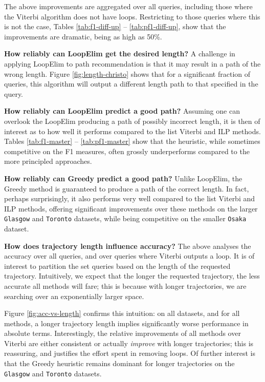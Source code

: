 The above improvements are aggregated over all queries, including those where the {\sc Viterbi} algorithm does not have loops.
Restricting to those queries where this is not the case,
Tables \ref{tab:f1-diff-up} -- \ref{tab:pf1-diff-up},
show that the improvements are dramatic, being as high as 50\%.

\textbf{How reliably can {\sc LoopElim} get the desired length?}
A challenge in applying {\sc LoopElim} to path recommendation
is that it may result in a path of the wrong length.
Figure \ref{fig:length-christo} shows that for a significant fraction of queries, this algorithm will output a different length path to that specified in the query.

\textbf{How reliably can {\sc LoopElim} predict a good path?}
Assuming one can overlook the {\sc LoopElim} producing a path of possibly incorrect length,
it is then of interest as to how well it performs compared to the list Viterbi and ILP methods.
Tables \ref{tab:f1-master} -- \ref{tab:pf1-master} show that the heuristic, while sometimes competitive on the F1 measures, often
grossly underperforms compared to the more principled approaches.


\textbf{How reliably can {\sc Greedy} predict a good path?}
Unlike {\sc LoopElim}, the {\sc Greedy} method is guaranteed to produce a path of the correct length.
In fact, perhaps surprisingly, it also performs very well compared to the list Viterbi and ILP methods, 
offering significant improvements over these methods on the larger {\tt Glasgow} and {\tt Toronto} datasets,
while being competitive on the smaller {\tt Osaka} dataset.


\textbf{How does trajectory length influence accuracy?}
The above analyses the accuracy over all queries, and over queries where {\sc Viterbi} outputs a loop.
It is of interest to partition the set queries based on the length of the requested trajectory.
Intuitively, we expect that the longer the requested trajectory, the less accurate all methods will fare; this is because with longer trajectories, we are searching over an exponentially larger space.

Figure \ref{fig:acc-vs-length} confirms this intuition:
on all datasets, and for all methods,
a longer trajectory length implies significantly worse performance in absolute terms.
Interestingly, the relative improvements of all methods over {\sc Viterbi} are either consistent or actually \emph{improve} with longer trajectories;
this is reassuring, and justifies the effort spent in removing loops.
Of further interest is that the {\sc Greedy} heuristic remains dominant for longer trajectories on the {\tt Glasgow} and {\tt Toronto} datasets.


